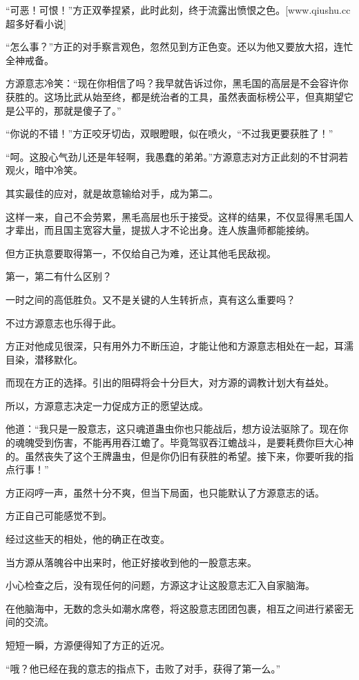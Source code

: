 \begin{this_body}
“可恶！可恨！”方正双拳捏紧，此时此刻，终于流露出愤恨之色。[www.qiushu.cc 超多好看小说]

“怎么事？”方正的对手察言观色，忽然见到方正色变。还以为他又要放大招，连忙全神戒备。

方源意志冷笑：“现在你相信了吗？我早就告诉过你，黑毛国的高层是不会容许你获胜的。这场比武从始至终，都是统治者的工具，虽然表面标榜公平，但真期望它是公平的，那就是傻子了。”

“你说的不错！”方正咬牙切齿，双眼瞪眼，似在喷火，“不过我更要获胜了！”

“呵。这股心气劲儿还是年轻啊，我愚蠢的弟弟。”方源意志对方正此刻的不甘洞若观火，暗中冷笑。

其实最佳的应对，就是故意输给对手，成为第二。

这样一来，自己不会劳累，黑毛高层也乐于接受。这样的结果，不仅显得黑毛国人才辈出，而且国主宽容大量，提拔人才不论出身。连人族蛊师都能接纳。

但方正执意要取得第一，不仅给自己为难，还让其他毛民敌视。

第一，第二有什么区别？

一时之间的高低胜负。又不是关键的人生转折点，真有这么重要吗？

不过方源意志也乐得于此。

方正对他成见很深，只有用外力不断压迫，才能让他和方源意志相处在一起，耳濡目染，潜移默化。

而现在方正的选择。引出的阻碍将会十分巨大，对方源的调教计划大有益处。

所以，方源意志决定一力促成方正的愿望达成。

他道：“我只是一股意志，这只魂道蛊虫你也只能战后，想方设法驱除了。现在你的魂魄受到伤害，不能再用吞江蟾了。毕竟驾驭吞江蟾战斗，是要耗费你巨大心神的。虽然丧失了这个王牌蛊虫，但是你仍旧有获胜的希望。接下来，你要听我的指点行事！”

方正闷哼一声，虽然十分不爽，但当下局面，也只能默认了方源意志的话。

方正自己可能感觉不到。

经过这些天的相处，他的确正在改变。

当方源从落魄谷中出来时，他正好接收到他的一股意志来。

小心检查之后，没有现任何的问题，方源这才让这股意志汇入自家脑海。

在他脑海中，无数的念头如潮水席卷，将这股意志团团包裹，相互之间进行紧密无间的交流。

短短一瞬，方源便得知了方正的近况。

“哦？他已经在我的意志的指点下，击败了对手，获得了第一么。”


\end{this_body}
